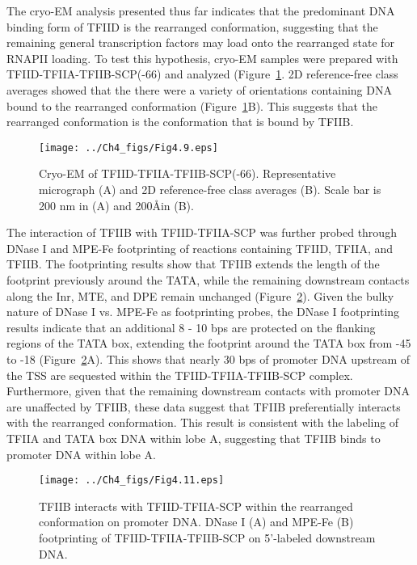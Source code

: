 The cryo-EM analysis presented thus far indicates that the predominant DNA binding form of TFIID is the rearranged conformation, suggesting that the remaining general transcription factors may load onto the rearranged state for RNAPII loading. To test this hypothesis, cryo-EM samples were prepared with TFIID-TFIIA-TFIIB-SCP(-66) and analyzed (Figure~\ref{fig:Fig4.9}. 2D reference-free class averages showed that the there were a variety of orientations containing DNA bound to the rearranged conformation (Figure~\ref{fig:Fig4.9}B). This suggests that the rearranged conformation is the conformation that is bound by TFIIB. \\
\begin{figure}
\centering
\texttt{[image: ../Ch4\_figs/Fig4.9.eps]}
\caption[Cryo-EM of TFIID-TFIIA-TFIIB-SCP(-66)]{Cryo-EM of TFIID-TFIIA-TFIIB-SCP(-66). Representative micrograph (A) and 2D reference-free class averages (B).  Scale bar is 200 nm in (A) and 200\AA in (B).}
\label{fig:Fig4.9}
\end{figure}
\indent The interaction of TFIIB with TFIID-TFIIA-SCP was further probed through DNase I and MPE-Fe footprinting of reactions containing TFIID, TFIIA, and TFIIB. The footprinting results show that TFIIB extends the length of the footprint previously around the TATA, while the remaining downstream contacts along the Inr, MTE, and DPE remain unchanged (Figure~\ref{fig:Fig4.11}). Given the bulky nature of DNase I vs. MPE-Fe as footprinting probes, the DNase I footprinting results indicate that an additional 8 - 10 bps are protected on the flanking regions of the TATA box, extending the footprint around the TATA box from -45 to -18 (Figure~\ref{fig:Fig4.11}A). This shows that nearly 30 bps of promoter DNA upstream of the TSS are sequested within the TFIID-TFIIA-TFIIB-SCP complex. Furthermore, given that the remaining downstream contacts with promoter DNA are unaffected by TFIIB, these data suggest that TFIIB preferentially interacts with the rearranged conformation. This result is consistent with the labeling of TFIIA and TATA box DNA within lobe A, suggesting that TFIIB binds to promoter DNA within lobe A.\\
\begin{figure}
\centering
\texttt{[image: ../Ch4\_figs/Fig4.11.eps]}
\caption[TFIIB interacts with TFIID-TFIIA-SCP within the rearranged conformation on promoter DNA]{TFIIB interacts with TFIID-TFIIA-SCP within the rearranged conformation on promoter DNA. DNase I (A) and MPE-Fe (B) footprinting of TFIID-TFIIA-TFIIB-SCP on 5'-labeled downstream DNA. }
\label{fig:Fig4.11}
\end{figure}
